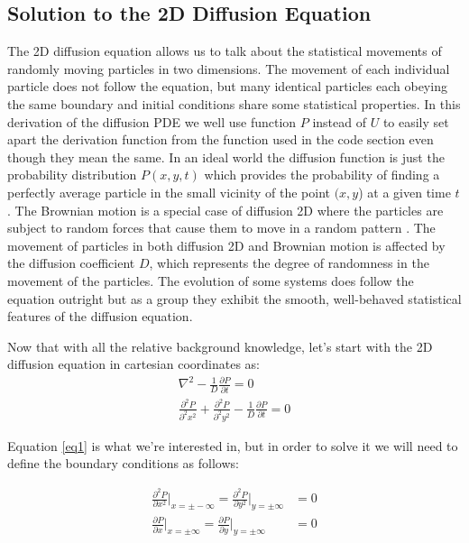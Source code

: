 \subsection{Solution to the 2D Diffusion Equation}
The 2D diffusion equation allows us to talk about the statistical movements of randomly moving particles in two dimensions. The movement of each individual particle does not follow the equation, but many identical particles each obeying the same boundary and initial conditions share some statistical properties. In this derivation of the diffusion PDE we well use function $P$ instead of $U$ to easily set apart the derivation function from the function used in the code section even though they mean the same. 
In an ideal world the diffusion function is just the probability distribution $P(x,y,t)$ which provides the probability of finding a perfectly average particle in the small vicinity of the point $(x,y$) at a given time $t$. The Brownian motion is a special case of diffusion 2D where the particles are subject to random forces that cause them to move in a random pattern \cite{Ursell2005}. The movement of particles in both diffusion 2D and Brownian motion is affected by the diffusion coefficient $D$, which represents the degree of randomness in the movement of the particles. The evolution of some systems does follow the equation outright but as a group they exhibit the smooth, well-behaved statistical features of the diffusion equation.

Now that with all the relative background knowledge, let's start with the 2D diffusion equation in cartesian coordinates as:
\begin{align*}
    \nabla^2 - \frac{1}{D} \frac{\partial P}{ \partial t} = 0 \\
    \frac{\partial^2 P}{ \partial^2 x^2} + \frac{\partial^2 P}{ \partial^2 y^2}  - \frac{1}{D} \frac{\partial P}{ \partial t} = 0 \tag{1}
    \label{eq1}
\end{align*}

Equation \eqref{eq1} is what we're interested in, but in order to solve it we will need to define the boundary conditions as follows:

\begin{align*}
   \frac{\partial^2 P}{\partial x^2} \bigg \vert_{x = \pm -\infty} = \frac{\partial^2 P}{\partial y^2} \bigg \vert_{y= \pm \infty} &= 0 \\
   \frac{\partial P}{\partial x} \bigg \vert_{x= \pm \infty} = \frac{\partial P}{\partial y} \bigg \vert_{y= \pm \infty} &= 0 \tag{B.C}
    \label{bc1}
\end{align*}

